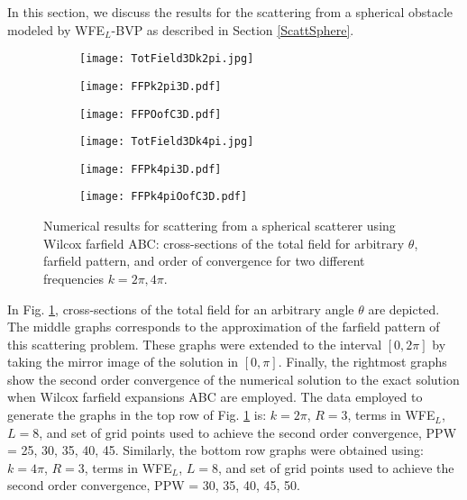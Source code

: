 \documentclass[final,3p,times,12pt]{elsarticle}
\begin{document}
In this section, we discuss the results for the scattering from a spherical obstacle modeled by WFE$_L$-BVP as described in Section \ref{ScattSphere}. 
\begin{figure}[!h]
\begin{subfigure}{0.37\textwidth}
\texttt{[image: TotField3Dk2pi.jpg]} 
\end{subfigure}
\begin{subfigure}{0.37\textwidth}
\texttt{[image: FFPk2pi3D.pdf]}
\end{subfigure}
\begin{subfigure}{0.25\textwidth}
\texttt{[image: FFPOofC3D.pdf]}
\end{subfigure}
\begin{subfigure}{0.37\textwidth}
\texttt{[image: TotField3Dk4pi.jpg]} 
\end{subfigure}
\begin{subfigure}{0.37\textwidth}
\texttt{[image: FFPk4pi3D.pdf]}
\end{subfigure}
\begin{subfigure}{0.25\textwidth}
\texttt{[image: FFPk4piOofC3D.pdf]}
\end{subfigure}
\vspace{-.7cm}
\caption{Numerical results for scattering from a spherical scatterer using Wilcox farfield ABC: cross-sections of the total field for arbitrary $\theta$, farfield pattern, and order of convergence for two different frequencies $k=2\pi,4\pi$.} 
\label{fig:3DSpericalScattering}
\end{figure}

In Fig. \ref{fig:3DSpericalScattering},  cross-sections of the total field for an arbitrary angle $\theta$ are depicted.  The middle graphs corresponds to the approximation of the farfield pattern of this scattering problem. These  graphs were extended to the interval $[0,2\pi]$ by taking the mirror image of the solution in $[0,\pi]$. Finally, the rightmost graphs show the second order convergence of the numerical solution to the exact solution when Wilcox farfield expansions ABC are employed. The data employed to generate the graphs in the top row of Fig.  \ref{fig:3DSpericalScattering} is: $k=2\pi$, $R=3$,
terms in WFE$_L$,  $L = 8$, and set of grid points used to achieve the second order convergence, PPW = 25, 30, 35, 40, 45. Similarly, the bottom row graphs were obtained using: $k=4\pi$, $R=3$, terms in WFE$_L$,  $L = 8$, and set of grid points used to achieve the second order convergence, PPW = 30, 35, 40, 45, 50.
\end{document}
